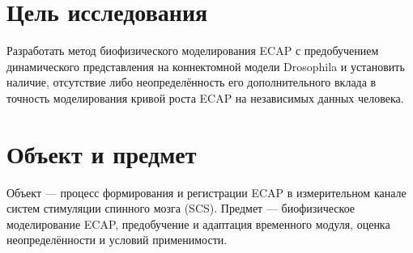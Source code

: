 \section*{Цель исследования}
Разработать метод биофизического моделирования ECAP с предобучением динамического представления на коннектомной модели Drosophila и установить наличие, отсутствие либо неопределённость его дополнительного вклада в точность моделирования кривой роста ECAP на независимых данных человека.
\section*{Объект и предмет}
Объект --- процесс формирования и регистрации ECAP в измерительном канале систем стимуляции спинного мозга (SCS). Предмет --- биофизическое моделирование ECAP, предобучение и адаптация временного модуля, оценка неопределённости и условий применимости.
